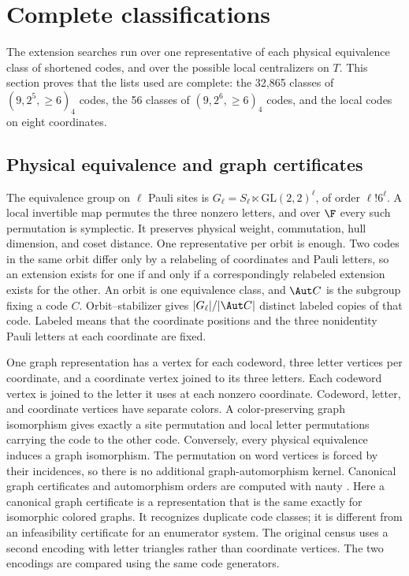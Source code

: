 \section{Complete classifications}\label{sec:classification}

The extension searches run over one representative of each physical
equivalence class of shortened codes, and over the possible local
centralizers on \(T\). This section proves that the lists used are
complete: the 32,865 classes of \((9,2^5,\geq6)_4\) codes, the 56 classes
of \((9,2^6,\geq6)_4\) codes, and the local codes on eight coordinates.

\subsection{Physical equivalence and graph certificates}

The equivalence group on \(\ell\) Pauli sites is
\(G_\ell=S_\ell\ltimes\mathrm{GL}(2,2)^\ell\), of order
\(\ell!6^\ell\). A local invertible map permutes the three nonzero
letters, and over \(\F\) every such permutation is symplectic.
It preserves physical weight, commutation, hull dimension, and coset
distance. One representative per orbit is enough.
Two codes in the same orbit differ only by a relabeling of coordinates
and Pauli letters, so an extension exists for one if and only if a
correspondingly relabeled extension exists for the other. An orbit is
one equivalence class, and \(\Aut C\) is the subgroup fixing a code
\(C\). Orbit--stabilizer gives \(|G_\ell|/|\Aut C|\)
distinct labeled copies of that code.
Labeled means that the coordinate positions and the three nonidentity
Pauli letters at each coordinate are fixed.

One graph representation has a vertex for each codeword,
three letter vertices per coordinate, and a coordinate vertex joined to
its three letters. Each codeword vertex is joined to the letter it uses
at each nonzero coordinate. Codeword, letter, and coordinate vertices
have separate colors.
A color-preserving graph isomorphism gives exactly a site permutation and
local letter permutations carrying the code to the other code.
Conversely, every physical equivalence induces a graph isomorphism.
The permutation on word vertices is forced by their incidences, so there
is no additional graph-automorphism kernel. Canonical graph certificates
and automorphism orders are computed with nauty \cite{nauty}.
Here a canonical graph certificate is a representation that is the same
exactly for isomorphic colored graphs. It recognizes duplicate code
classes; it is different from an infeasibility certificate for an
enumerator system.
The original census uses a second encoding with letter triangles rather
than coordinate vertices. The two encodings are compared using the same code generators.

